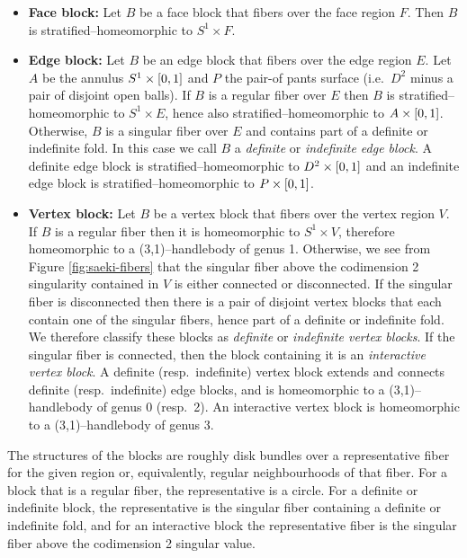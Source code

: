 {\renewcommand\labelitemi{}
	\begin{itemize}
		\item \textbf{Face block:}
		Let $B$ be a face block that fibers over the face region $F$.
		Then $B$ is stratified--homeomorphic to $S^1\times F$.
		
		\item \textbf{Edge block:}
		Let $B$ be an edge block that fibers over the edge region $E$.
		Let $A$ be the annulus $S^1\times[0,1]$ and $P$ the pair-of pants surface (i.e.\ $D^2$ minus a pair of disjoint open balls).
		If $B$ is a regular fiber over $E$ then $B$ is stratified--homeomorphic to $S^1\times E$, hence also stratified--homeomorphic to $A\times[0,1]$.
		Otherwise, $B$ is a singular fiber over $E$ and contains part of a definite or indefinite fold.
		In this case we call $B$ a \emph{definite} or \emph{indefinite edge block}.
		A definite edge block is stratified--homeomorphic to $D^2\times[0,1]$ and an indefinite edge block is stratified--homeomorphic to $P\times[0,1]$.
		
		\item \textbf{Vertex block:}
		Let $B$ be a vertex block that fibers over the vertex region $V$.
		If $B$ is a regular fiber then it is homeomorphic to $S^1\times V$, therefore homeomorphic to a (3,1)--handlebody of genus 1.
		Otherwise, we see from Figure \ref{fig:saeki-fibers} that the singular fiber above the codimension 2 singularity contained in $V$ is either connected or disconnected.
		If the singular fiber is disconnected then there is a pair of disjoint vertex blocks that each contain one of the singular fibers, hence part of a definite or indefinite fold.
		We therefore classify these blocks as \emph{definite} or \emph{indefinite vertex blocks}.
		If the singular fiber is connected, then the block containing it is an \emph{interactive vertex block}.
		A definite (resp.\ indefinite) vertex block extends and connects definite (resp.\ indefinite) edge blocks, and is homeomorphic to a (3,1)--handlebody of genus 0 (resp.\ 2).
		An interactive vertex block is homeomorphic to a (3,1)--handlebody of genus 3.
	\end{itemize}
}

\begin{rmk}
	The structures of the blocks
	are roughly disk bundles over a representative fiber for the given region or, equivalently, regular neighbourhoods of that fiber.
	For a block that is a regular fiber, the representative is a circle.
	For a definite or indefinite block, the representative is the singular fiber containing a definite or indefinite fold, and for an interactive block the representative fiber is the singular fiber above the codimension 2 singular value.
\end{rmk}


